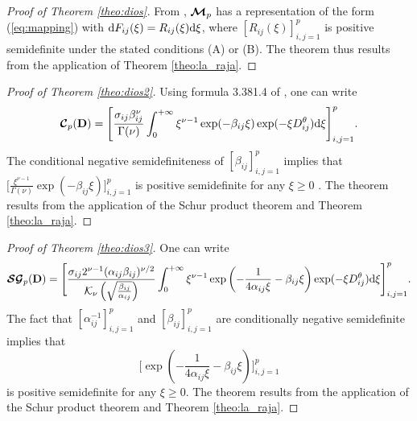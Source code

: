 \documentclass[12pt]{article}
\theoremstyle{plain}
\newtheorem{lemma}[theorem]{Lemma}
\theoremstyle{remark}
\newcommand{\latMatr}[1]{\mathbf{#1}}          %
\begin{document}
    
    \begin{proof}[Proof of Theorem \ref{theo:dios}]
        {From \citet[Equations (28)-(30) and Theorem 3]{EPW}, $\boldsymbol{{\cal M}}_p$ has a representation of the form (\ref{eq:mapping}) with ${\rm d}F_{ij}(\xi)=R_{ij}(\xi) {\rm d}\xi$, where $[R_{ij}(\xi)]_{i,j=1}^p$ is positive semidefinite under the stated conditions (A) or (B). The theorem thus results from the application of Theorem \ref{theo:la_raja}.}
    \end{proof}
    
    {\begin{proof}[Proof of Theorem \ref{theo:dios2}]
    Using formula 3.381.4 of \cite{grad}, one can write 
    \begin{equation*}
        \boldsymbol{{\cal C}}_p(\latMatr{D}) = \Bigg[ \frac{\sigma_{ij} \beta_{ij}^\nu}{\Gamma(\nu)} \int_0^{+\infty} \xi^{\nu-1} \exp(-\beta_{ij} \xi) \exp(-\xi D_{ij}^\theta) {\rm d}\xi \Bigg]_{i,j=1}^p.
    \end{equation*}
    The conditional negative semidefiniteness of $[\beta_{ij}]_{i,j=1}^p$ implies that $\big[\frac{\xi^{\nu-1}}{\Gamma(\nu)} \exp(-\beta_{ij} \xi)\big]_{i,j=1}^p$ is positive semidefinite for any $\xi \geq 0$ \citep[Lemma 2.5]{Reams}. The theorem results from the application of the Schur product theorem and Theorem \ref{theo:la_raja}.
    \end{proof}}
    
    
    \begin{proof}[Proof of Theorem \ref{theo:dios3}]
        One can write \citep{porcu2018shkarofsky}
        \begin{equation*}
            \boldsymbol{{\cal SG}}_p(\latMatr{D}) = \Bigg[ \frac{\sigma_{ij} 2^{\nu-1} (\alpha_{ij} \beta_{ij})^{\nu/2}}{{\cal K}_\nu\left(\sqrt{\frac{\beta_{ij}}{\alpha_{ij}}}\right)} \int_0^{+\infty} \xi^{\nu-1} \exp\left(- \frac{1}{4\alpha_{ij} \xi}-\beta_{ij} \xi \right)  \exp(-\xi D_{ij}^\theta) {\rm d}\xi \Bigg]_{i,j=1}^p.
        \end{equation*}
        The fact that $[\alpha^{-1}_{ij}]_{i,j=1}^p$ and $[\beta_{ij}]_{i,j=1}^p$ are conditionally negative semidefinite implies that $$\big[\exp\left(- \frac{1}{4\alpha_{ij} \xi}-\beta_{ij} \xi \right)\big]_{i,j=1}^p$$ is positive semidefinite for any $\xi \geq 0$. The theorem results from the application of the Schur product theorem and Theorem \ref{theo:la_raja}.
    \end{proof}
    
    
    
\end{document}
